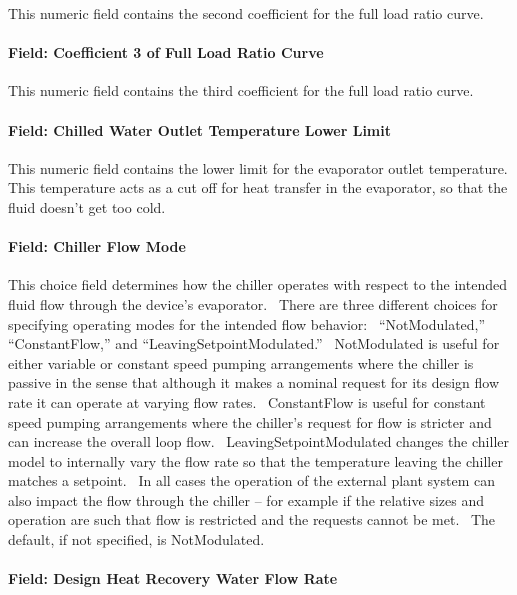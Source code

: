This numeric field contains the second coefficient for the full load ratio curve.

\paragraph{Field: Coefficient 3 of Full Load Ratio Curve}\label{field-coefficient-3-of-full-load-ratio-curve}

This numeric field contains the third coefficient for the full load ratio curve.

\paragraph{Field: Chilled Water Outlet Temperature Lower Limit}\label{field-chilled-water-outlet-temperature-lower-limit-2}

This numeric field contains the lower limit for the evaporator outlet temperature. This temperature acts as a cut off for heat transfer in the evaporator, so that the fluid doesn't get too cold.

\paragraph{Field: Chiller Flow Mode}\label{field-chiller-flow-mode-3}

This choice field determines how the chiller operates with respect to the intended fluid flow through the device's evaporator.~ There are three different choices for specifying operating modes for the intended flow behavior:~ ``NotModulated,'' ``ConstantFlow,'' and ``LeavingSetpointModulated.''~ NotModulated is useful for either variable or constant speed pumping arrangements where the chiller is passive in the sense that although it makes a nominal request for its design flow rate it can operate at varying flow rates.~ ConstantFlow is useful for constant speed pumping arrangements where the chiller's request for flow is stricter and can increase the overall loop flow.~ LeavingSetpointModulated changes the chiller model to internally vary the flow rate so that the temperature leaving the chiller matches a setpoint.~ In all cases the operation of the external plant system can also impact the flow through the chiller -- for example if the relative sizes and operation are such that flow is restricted and the requests cannot be met.~ The default, if not specified, is NotModulated.

\paragraph{Field: Design Heat Recovery Water Flow Rate}\label{field-design-heat-recovery-water-flow-rate-000}

